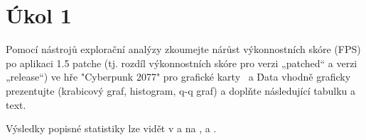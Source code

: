 \section*{Úkol 1}
\label{sec:task-1}

Pomocí nástrojů explorační analýzy zkoumejte nárůst výkonnostních skóre (FPS) po aplikaci 1.5 patche 
(tj. rozdíl výkonnostních skóre pro verzi „patched“ a verzi „release“) ve hře "Cyberpunk 2077" pro grafické karty 
\nvidiaCard\ a \amdCard\. Data vhodně graficky prezentujte (krabicový graf, histogram, q-q graf)
a doplňte následující tabulku a text.

\vspace{2em}
\noindent
Výsledky popisné statistiky lze vidět v  a na  ,  a .

\newcommand{\rangeValues}       {70,        59,         69,         58}
\newcommand{\minValues}         {-4.8,      4.2,        5.1,        4.2}
\newcommand{\QfValues}          {5.425,     4.900,      5.500,      4.900}
\newcommand{\medianValues}      {5.700,     5.300,      5.700,      5.300}
\newcommand{\meanValues}        {5.600,     5.371,      5.750,      5.191}
\newcommand{\QtValues}          {6.100,     5.550,      6.100,      5.500}
\newcommand{\maxValues}         {6.6,       15.8,       6.6,        5.9}
\newcommand{\sdValues}          {1.335,     1.452,      0.439,      0.451}
\newcommand{\cvValues}          {23.8,      27.0,       7.6,        8.7}
\newcommand{\skewnessValues}    {-6.9,      6.4,        0.2,        -0.4}
\newcommand{\kurtosisValues}    {51.3,      43.8,       -1.0,       -0.7}
\newcommand{\lowerBoundValues}  {4.41,      3.92,       0,          0}
\newcommand{\upperBoundValues}  {7.11,      6.52,       0,          0}

\newcommand{\sigmaValues} {4.873, 6.628, 4.289, 6.093}

\newcommand{\tableValue}[2]{%
    \pgfmathparse{{#1}[#2]}%
    \edef\tempResult{\pgfmathresult}%
    \ifnum\pdfstrcmp{\tempResult}{inf}=0 %
        $\infty$%
    \else%
        \mbox{\tempResult}%
    \fi%
}

\newcommand{\nvidiaCard}{Nvidia RTX 3070 Ti}
\newcommand{\amdCard} {AMD Radeon RX 7700 XT}

